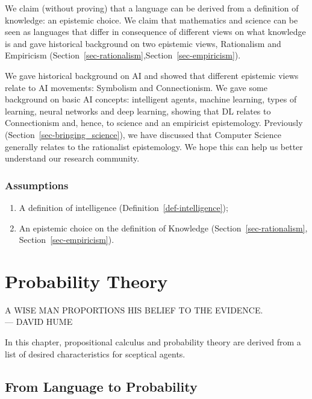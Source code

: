 \documentclass[
  letterpaper,
  12pt,
  british]{tufte-book}
\renewcommand{\textls}[2][5]{%
  \begingroup\addfontfeatures{LetterSpace=#1}#2\endgroup
}
\renewcommand{\allcaps}[1]{\textls[15]{\MakeTextUppercase{#1}}}
\newcommand{\epigraph}[2]{%
  \begin{fullwidth}
  \begin{flushright}
  \sffamily\fontsize{8}{10}\selectfont
  \sffamily\footnotesize
  \begin{doublespace}
  \vspace{-8cm}\noindent\allcaps{#1}\\%
  \noindent\allcaps{#2}\\%
  \end{doublespace}
  \vspace{5.1cm}
  \end{flushright}
  \end{fullwidth}
  \normalfont
}
\renewenvironment{quote}{
  \list{}{\leftmargin=3.5cm\topsep=0pt}
  \item\relax\small\itshape
}
{\endlist}
\theoremstyle{plain}
\theoremstyle{plain}
\theoremstyle{definition}
\theoremstyle{remark}
\begin{document}
We claim (without proving) that a language can be derived from a
definition of knowledge: an epistemic choice. We claim that mathematics
and science can be seen as languages that differ in consequence of
different views on what knowledge is and gave historical background on
two epistemic views, Rationalism and Empiricism
(Section~\ref{sec-rationalism},Section~\ref{sec-empiricism}).

We gave historical background on {AI} and showed that different
epistemic views relate to {AI} movements: Symbolism and Connectionism.
We gave some background on basic {AI} concepts: intelligent agents,
machine learning, types of learning, neural networks and deep learning,
showing that {DL} relates to Connectionism and, hence, to science and an
empiricist epistemology. Previously
(Section~\ref{sec-bringing_science}), we have discussed that Computer
Science generally relates to the rationalist epistemology. We hope this
can help us better understand our research community.

\hypertarget{assumptions}{%
\subsection{Assumptions}\label{assumptions}}

\begin{enumerate}
\def\labelenumi{\arabic{enumi}.}
\item
  A definition of intelligence (Definition~\ref{def-intelligence});
\item
  An epistemic choice on the definition of Knowledge
  (Section~\ref{sec-rationalism}, Section~\ref{sec-empiricism}).
\end{enumerate}

\begin{quote}
\end{quote}

\hypertarget{probability-theory}{%
\chapter{Probability Theory}\label{probability-theory}}

\epigraph{A wise man proportions his belief to the evidence.}{--- David Hume}

In this chapter, propositional calculus and probability theory are
derived from a list of desired characteristics for sceptical agents.

\hypertarget{sec-language_probability}{%
\section{From Language to Probability}\label{sec-language_probability}}
\end{document}
